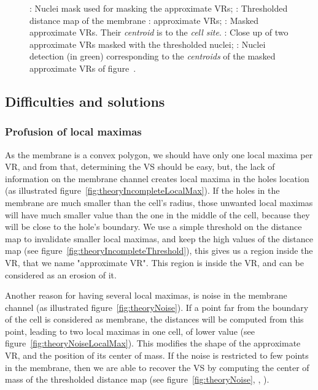 \begin{figure}[htb]
{: Nuclei mask used for masking the approximate VRs;
: Thresholded distance map of the membrane : approximate VRs;
: Masked approximate VRs. Their \emph{centroid} is to the \emph{cell site}.
: Close up of two approximate VRs masked with the thresholded nuclei;
: Nuclei detection (in green) corresponding to the \emph{centroids} of the masked approximate VRs of figure~.%
}
  \label{fig:propIllustr}
\end{figure}




\subsection{Difficulties and solutions}
\label{sect:difficultiesTheory}

\subsubsection{Profusion of local maximas}

As the membrane is a convex polygon, we should have only one local maxima per VR, 
and from that, determining the VS should be easy, but,
the lack of information on the membrane channel creates local maxima in the holes location (as illustrated figure~\ref{fig:theoryIncompleteLocalMax}).
If the holes in the membrane are much smaller than the cell's radius,
those unwanted local maximas will have much smaller value than the one in the middle of the cell,
because they will be close to the hole's boundary.
We use a simple threshold on the distance map to invalidate smaller local maximas, and keep the high values of the distance map (see figure~\ref{fig:theoryIncompleteThreshold}), this gives us a region inside the VR, that we name "approximate VR".
This region is inside the VR, and can be considered as an erosion of it. 

Another reason for having several local maximas, is noise in the membrane channel (as illustrated figure~\ref{fig:theoryNoise}).
If a point far from the boundary of the cell is considered as membrane, the distances will be computed from this point, leading to two local maximas in one cell, of lower value (see figure~\ref{fig:theoryNoiseLocalMax}). This modifies the shape of the approximate VR, and the position of its center of mass.
If the noise is restricted to few points in the membrane, then we are able to recover the VS by computing the center of mass of the thresholded distance map (see figure~\ref{fig:theoryNoise}, , ).

